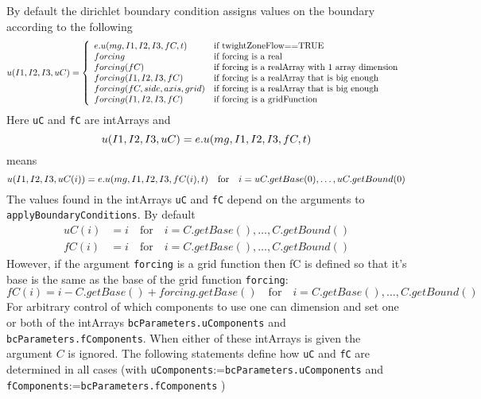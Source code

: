 By default the dirichlet boundary condition assigns values on the boundary according to the
following
\[
u(I1,I2,I3,uC) = 
  \left\{ \begin{array}{ll}
        e. u(mg,I1,I2,I3,fC,t)    & \mbox{if twightZoneFlow==TRUE} \\
        forcing              & \mbox{if forcing is a real      } \\
        forcing(fC)           & \mbox{if forcing  is a realArray with 1 array dimension } \\
        forcing(I1,I2,I3,fC)  & \mbox{if forcing is a realArray that is big enough} \\
        forcing(fC,side,axis,grid) & \mbox{if forcing is a realArray that is big enough} \\
        forcing(I1,I2,I3,fC)  & \mbox{if forcing is a gridFunction} \\
          \end{array}
  \right.
\]
Here {\tt uC} and {\tt fC} are intArrays and
\[
u(I1,I2,I3,uC) =  e. u(mg,I1,I2,I3,fC,t)
\]
means
\[
u(I1,I2,I3,uC(i)) =  e. u(mg,I1,I2,I3,fC(i),t) \quad \mbox{for} \quad i=uC.getBase(0),\ldots,uC.getBound(0) 
\]
The values found in the intArrays {\tt uC} and {\tt fC} depend on the arguments to {\tt apply\-Boundary\-Conditions}.
By default
\begin{align*}
    uC(i) &= i \quad\text{for}\quad i=C.getBase(),\ldots,C.getBound() \\
    fC(i) &= i \quad\text{for}\quad i=C.getBase(),\ldots,C.getBound()
\end{align*}
However, if the argument {\tt forcing} is a grid function then fC is defined so that it's base is the same
as the base of the grid function {\tt forcing}:
\[
    fC(i) = i-C.getBase()+forcing.getBase() \quad\text{for}\quad i=C.getBase(),\ldots,C.getBound()
\]
For arbitrary control of which components to use one can dimension and set one or both of the intArrays
{\tt bc\-Para\-meters.uComp\-onents} and {\tt bc\-Para\-meters.fComp\-onents}. When either of these intArrays is given
the argument $C$ is ignored. The following statements define how {\tt uC} and {\tt fC} are
determined in all cases (with 
{\tt uComponents}:={\tt bc\-Para\-meters.uComp\-onents} and 
{\tt fComponents}:={\tt bc\-Para\-meters.fComp\-onents} )



